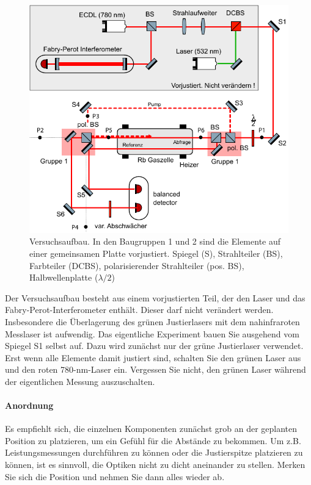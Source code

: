 \begin{figure}
   \includegraphics[width=\textwidth]{bilder/setup_rb.pdf}
   \caption{Versuchsaufbau. In den Baugruppen 1 und 2 sind die Elemente auf einer gemeinsamen Platte vorjustiert. Spiegel (S), Strahlteiler (BS), Farbteiler (DCBS), polarisierender Strahlteiler (pos. BS), Halbwellenplatte ($\lambda/2$) }
\end{figure}

Der Versuchsaufbau besteht aus einem vorjustierten Teil, der den Laser und das Fabry-Perot-Interferometer enthält. Dieser darf nicht verändert werden. Insbesondere die Überlagerung des grünen Justierlasers mit dem nahinfraroten Messlaser ist aufwendig. Das eigentliche Experiment bauen Sie ausgehend vom Spiegel S1 selbst auf. Dazu wird zunächst nur der grüne Justierlaser verwendet. Erst wenn alle Elemente damit justiert sind, schalten Sie den grünen Laser aus und den roten 780-nm-Laser ein. Vergessen Sie nicht, den grünen Laser während der eigentlichen Messung auszuschalten.

\paragraph{Anordnung} Es empfiehlt sich, die einzelnen Komponenten zunächst grob an der geplanten Position zu platzieren, um ein Gefühl für die Abstände zu bekommen. Um z.B. Leistungsmessungen durchführen zu können oder die Justierspitze platzieren zu können, ist es sinnvoll, die Optiken nicht zu dicht aneinander zu stellen. Merken Sie sich die Position und nehmen Sie dann alles wieder ab.

